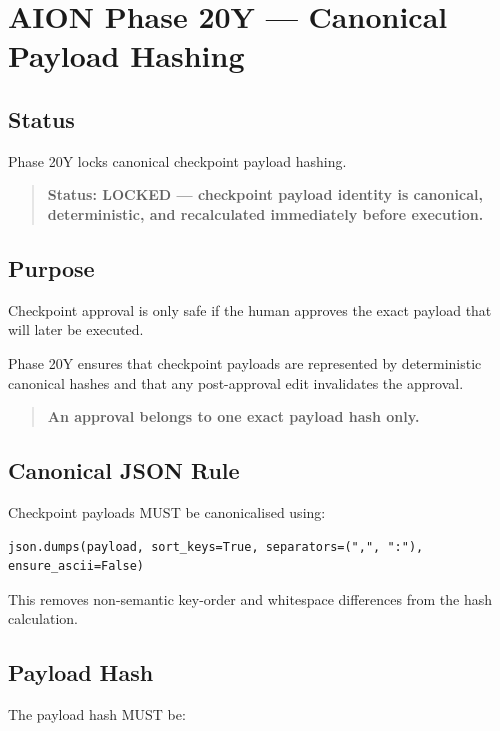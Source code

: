 \section{AION Phase 20Y --- Canonical Payload Hashing}
\label{sec:aion-phase20y-canonical-payload-hashing}

\subsection{Status}

Phase 20Y locks canonical checkpoint payload hashing.

\begin{quote}
\textbf{Status: LOCKED --- checkpoint payload identity is canonical, deterministic, and recalculated immediately before execution.}
\end{quote}

\subsection{Purpose}

Checkpoint approval is only safe if the human approves the exact payload that will later be executed.

Phase 20Y ensures that checkpoint payloads are represented by deterministic canonical hashes and that any post-approval edit invalidates the approval.

\begin{quote}
\textbf{An approval belongs to one exact payload hash only.}
\end{quote}

\subsection{Canonical JSON Rule}

Checkpoint payloads MUST be canonicalised using:

\begin{verbatim}
json.dumps(payload, sort_keys=True, separators=(",", ":"), ensure_ascii=False)
\end{verbatim}

This removes non-semantic key-order and whitespace differences from the hash calculation.

\subsection{Payload Hash}

The payload hash MUST be:

